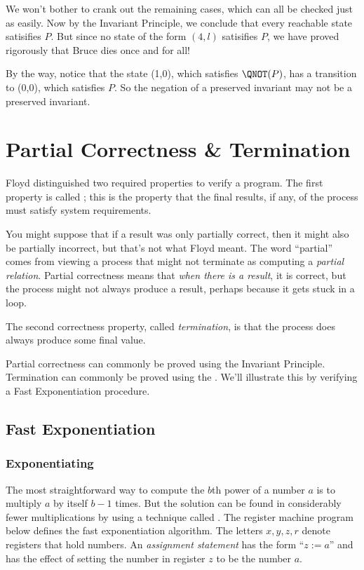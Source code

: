 We won't bother to crank out the remaining cases, which can all be checked
just as easily.  Now by the Invariant Principle, we conclude that every
reachable state satisifies $P$.  But since no state of the form $(4,l)$
satisifies $P$, we have proved rigorously that Bruce dies once and for
all!

By the way, notice that the state (1,0), which satisfies $\QNOT(P)$, has a
transition to (0,0), which satisfies $P$.  So the negation of a preserved
invariant may not be a preserved invariant.

\section{Partial Correctness \& Termination}\label{partial_correct_sec}

Floyd distinguished two required properties to verify a program.  The
first property is called ; this is the property
that the final results, if any, of the process must satisfy system
requirements.

You might suppose that if a result was only partially correct, then it
might also be partially incorrect, but that's not what Floyd meant.  The
word ``partial'' comes from viewing a process that might not terminate as
computing a \emph{partial relation}.  Partial correctness means that
\emph{when there is a result}, it is correct, but the process might not
always produce a result, perhaps because it gets stuck in a loop.

The second correctness property, called%
\emph{termination}, is that the
process does always produce some final value.

Partial correctness can commonly be proved using the Invariant Principle.
Termination can commonly be proved using the .
We'll illustrate this by verifying a Fast Exponentiation procedure.

\subsection{Fast Exponentiation}\label{fast_exp_subsec}

\subsubsection{Exponentiating}\label{fast_exp_subsubsec}
The most straightforward way to compute the $b$th power of a number
$a$ is to multiply $a$ by itself $b-1$ times.  But the solution can
be found in considerably fewer multiplications by using a technique
called .  The register machine program below
defines the fast exponentiation algorithm.  The letters $x,y,z,r$
denote registers that hold numbers. An \emph{assignment statement} has
the form ``$z := a$'' and has the effect of setting the number in
register $z$ to be the number $a$.

